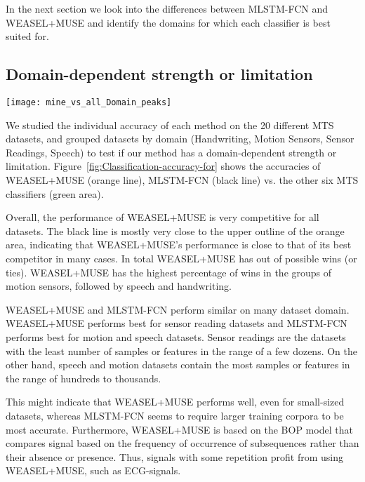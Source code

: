 \documentclass[sigconf]{acmart}
\begin{document}
In the next section we look into the differences between MLSTM-FCN and WEASEL+MUSE and identify the domains for which each classifier is best suited for.

\subsection{Domain-dependent strength or limitation}\label{subsec:accuracy_by_dataset_and_domain}

\begin{figure*}[t]
	\texttt{[image: mine\_vs\_all\_Domain\_peaks]}
	\caption{Classification accuracies on the  MTS datasets for WEASEL+MUSE (orange), MLSTM-FCN (black) vs six state-of-the-art MTSC. The green area represents the classifiers' accuracies.\label{fig:Classification-accuracy-for}}
\end{figure*}

We studied the individual accuracy of each method on the 20 different MTS datasets, and grouped datasets by domain (Handwriting, Motion Sensors, Sensor Readings, Speech) to test if our method has a domain-dependent strength or limitation. 
Figure~\ref{fig:Classification-accuracy-for} shows the accuracies of WEASEL+MUSE (orange line), MLSTM-FCN (black line)  vs. the other six MTS classifiers (green area).

Overall, the performance of WEASEL+MUSE is very competitive for all datasets. The black line is mostly very close to the upper outline of the orange area, indicating that WEASEL+MUSE's performance is close to that of its best competitor in many cases. In total WEASEL+MUSE has  out of  possible wins (or ties). WEASEL+MUSE has the highest percentage of wins in the  groups of motion sensors, followed by speech and handwriting. 

WEASEL+MUSE and MLSTM-FCN perform similar on many dataset domain. WEASEL+MUSE performs best for sensor reading datasets and MLSTM-FCN performs best for motion and speech datasets. Sensor readings are the datasets with the least number of samples  or features  in the range of a few dozens. On the other hand, speech and motion datasets contain the most samples or features in the range of hundreds to thousands. 

This might indicate that WEASEL+MUSE performs well, even for small-sized datasets, whereas MLSTM-FCN seems to require larger training corpora to be most accurate. 
Furthermore, WEASEL+MUSE is based on the BOP model that compares signal based on the frequency of occurrence of subsequences rather than their absence or presence. Thus, signals with some repetition profit from using WEASEL+MUSE, such as ECG-signals.
\end{document}
